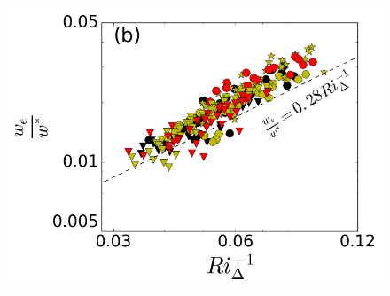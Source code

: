 \begin{figure}[htbp]
\begin{minipage}[b]{0.5\linewidth}
{                \includegraphics[scale=.3]{figures/scaledweinvri_Delta_f_GM}}\\      
        \\      
       

\end{minipage}
\end{figure}
